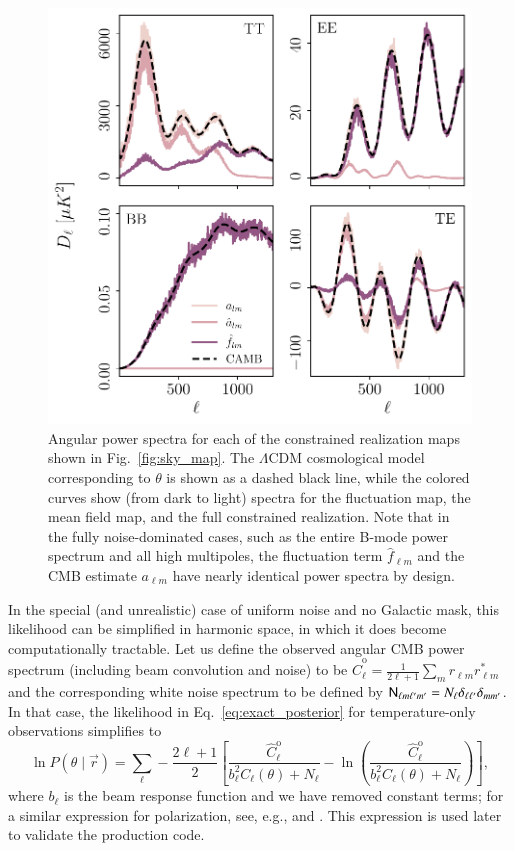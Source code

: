 \documentclass[twocolumn]{aa}
\newcommand{\N}[0]{\tens{N}}
\renewcommand{\r}[0]{\vec{r}}
\begin{document}
\begin{figure}
	\centering
	\includegraphics[width=\linewidth]{figures/sigma_ell.pdf}
	\caption{\label{fig:sigma_ell}Angular power spectra for each of the constrained realization maps shown in Fig.~\ref{fig:sky_map}. The $\Lambda$CDM cosmological model corresponding to $\theta$ is shown as a dashed black line, while the colored curves show (from dark to light) spectra for the fluctuation map, the mean field map, and the full constrained realization. Note that in the fully noise-dominated cases, such as the entire B-mode power spectrum and all high multipoles, the fluctuation term $\hat f_{\ell m}$ and the CMB estimate $a_{\ell m}$ have nearly identical power spectra by design.}
\end{figure}

In the special (and unrealistic) case of uniform noise and no Galactic mask, this likelihood can be simplified in harmonic space, in which it does become computationally tractable. Let us define the observed angular CMB power spectrum (including beam convolution and noise) to be $\hat{C}^{\mathrm{o}}_{\ell} = \frac{1}{2\ell+1}\sum_m r_{\ell m}r^*_{\ell m}$ and the corresponding white noise spectrum to be defined by $\N_{\ell m \ell'm'} = N_\ell \delta_{\ell \ell'}\delta_{mm'}$. In that case, the likelihood in Eq.~\eqref{eq:exact_posterior} for temperature-only observations simplifies to
{\small \begin{equation}
  \ln P(\theta \mid \r) = \sum_{\ell} -\frac{2\ell+1}{2} \left[\frac{\hat{C}^{\mathrm{o}}_{\ell}}{b_\ell^2 C_{\ell}(\theta) + N_\ell}-\ln \left(\frac{\hat{C}^{\mathrm{o}}_{\ell}}{b_\ell^2 C_{\ell}(\theta) + N_\ell} \right) \right],
  \label{eq:exact_harm}
\end{equation}}
where $b_\ell$ is the beam response function and we have removed constant terms; for a similar expression for polarization, see, e.g., \citet{larson:2006} and \citet{Hamimeche:2008ai}. This expression is used later to validate the production code.
\end{document}
